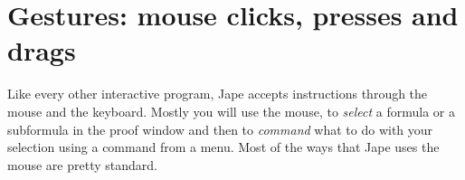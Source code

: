 \documentclass[11pt]{book}
\begin{document}
\chapter{Gestures: mouse clicks, presses and drags}
\label{chap:gestures}

Like every other interactive program, Jape accepts instructions through the mouse and the keyboard. Mostly you will use the mouse, to \emph{select} a formula or a subformula in the proof window and then to \emph{command} what to do with your selection using a command from a menu. Most of the ways that Jape uses the mouse are pretty standard.

\begin{figure}
\centering
{}
\quad
{}
\quad
{}

\end{figure}
\end{document}
